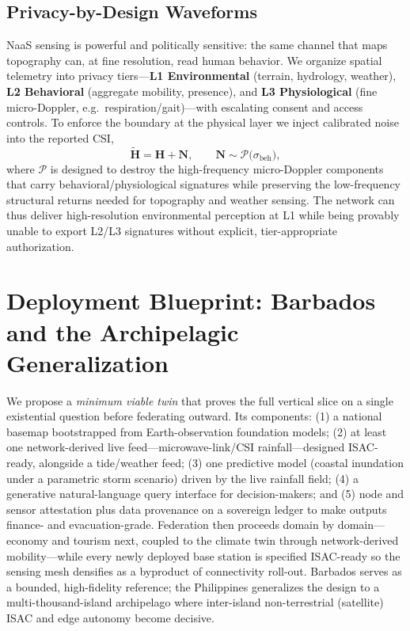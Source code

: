 \documentclass[10pt,twocolumn]{article}
\begin{document}
\subsection{Privacy-by-Design Waveforms}
NaaS sensing is powerful and politically sensitive: the same channel that maps
topography can, at fine resolution, read human behavior. We organize spatial
telemetry into privacy tiers---\textbf{L1 Environmental} (terrain, hydrology,
weather), \textbf{L2 Behavioral} (aggregate mobility, presence), and \textbf{L3
Physiological} (fine micro-Doppler, e.g.\ respiration/gait)---with escalating
consent and access controls. To enforce the boundary at the physical layer we
inject calibrated noise into the reported CSI,
\begin{equation}
\tilde{\mathbf{H}} = \mathbf{H} + \mathbf{N},\qquad
\mathbf{N}\sim\mathcal{P}\big(\sigma_{\mathrm{beh}}\big),
\end{equation}
where $\mathcal{P}$ is designed to destroy the high-frequency micro-Doppler
components that carry behavioral/physiological signatures while preserving the
low-frequency structural returns needed for topography and weather sensing. The
network can thus deliver high-resolution environmental perception at L1 while
being provably unable to export L2/L3 signatures without explicit,
tier-appropriate authorization.

\section{Deployment Blueprint: Barbados and the Archipelagic Generalization}
\label{sec:deploy}

We propose a \emph{minimum viable twin} that proves the full vertical slice on a
single existential question before federating outward. Its components: (1) a
national basemap bootstrapped from Earth-observation foundation models; (2) at
least one network-derived live feed---microwave-link/CSI rainfall---designed
ISAC-ready, alongside a tide/weather feed; (3) one predictive model (coastal
inundation under a parametric storm scenario) driven by the live rainfall field;
(4) a generative natural-language query interface for decision-makers; and (5)
node and sensor attestation plus data provenance on a sovereign ledger to make
outputs finance- and evacuation-grade. Federation then proceeds domain by
domain---economy and tourism next, coupled to the climate twin through
network-derived mobility---while every newly deployed base station is specified
ISAC-ready so the sensing mesh densifies as a byproduct of connectivity
roll-out. Barbados serves as a bounded, high-fidelity reference; the Philippines
generalizes the design to a multi-thousand-island archipelago where inter-island
non-terrestrial (satellite) ISAC and edge autonomy become decisive.
\end{document}
